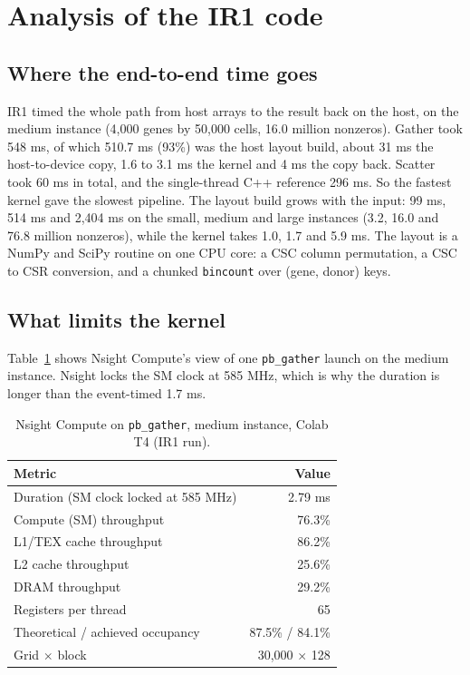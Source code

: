 \documentclass[sigconf,nonacm]{acmart}
\newcommand{\code}[1]{\texttt{#1}}
\begin{document}
\section{Analysis of the IR1 code}
\label{sec:analysis}

\subsection{Where the end-to-end time goes}

IR1 timed the whole path from host arrays to the result back on the host, on the medium instance
(4,000 genes by 50,000 cells, 16.0 million nonzeros). Gather took 548 ms, of which 510.7 ms (93\%) was
the host layout build, about 31 ms the host-to-device copy, 1.6 to 3.1 ms the kernel and 4 ms the copy
back. Scatter took 60 ms in total, and the single-thread C++ reference 296 ms. So the fastest kernel
gave the slowest pipeline. The layout build grows with the input: 99 ms, 514 ms and 2,404 ms on the
small, medium and large instances (3.2, 16.0 and 76.8 million nonzeros), while the kernel takes 1.0,
1.7 and 5.9 ms. The layout is a NumPy and SciPy routine on one CPU core: a CSC column permutation, a
CSC to CSR conversion, and a chunked \code{bincount} over (gene, donor) keys.

\subsection{What limits the kernel}

Table~\ref{tab:ncu} shows Nsight Compute's view of one \code{pb\_gather} launch on the medium
instance. Nsight locks the SM clock at 585 MHz, which is why the duration is longer than the
event-timed 1.7 ms.

\begin{table}[t]
\caption{Nsight Compute on \code{pb\_gather}, medium instance, Colab T4 (IR1 run).}
\label{tab:ncu}
\small
\begin{tabular}{@{}lr@{}}
\toprule
Metric & Value \\
\midrule
Duration (SM clock locked at 585 MHz) & 2.79 ms \\
Compute (SM) throughput & 76.3\% \\
L1/TEX cache throughput & 86.2\% \\
L2 cache throughput & 25.6\% \\
DRAM throughput & 29.2\% \\
Registers per thread & 65 \\
Theoretical / achieved occupancy & 87.5\% / 84.1\% \\
Grid $\times$ block & 30,000 $\times$ 128 \\
\bottomrule
\end{tabular}
\end{table}
\end{document}
